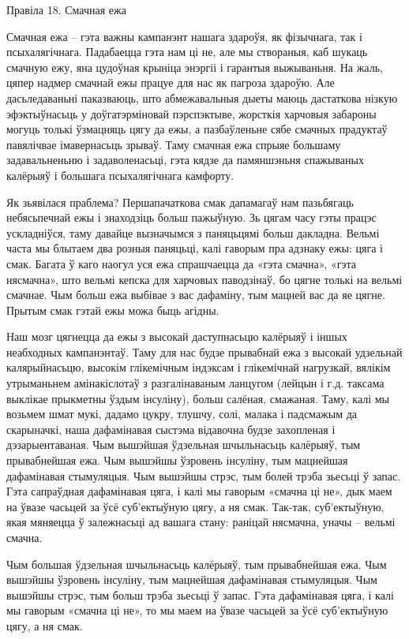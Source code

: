 Правіла 18. Смачная ежа

Смачная ежа – гэта важны кампанэнт нашага здароўя, як фізычнага, так і псыхалягічнага. Падабаецца гэта нам ці не, але мы створаныя, каб шукаць смачную ежу, яна цудоўная крыніца энэргіі і гарантыя выжываньня. На жаль, цяпер надмер смачнай ежы працуе для нас як пагроза здароўю. Але дасьледаваньні паказваюць, што абмежавальныя дыеты маюць дастаткова нізкую эфэктыўнасьць у доўгатэрміновай пэрспэктыве, жорсткія харчовыя забароны могуць толькі ўзмацняць цягу да ежы, а пазбаўленьне сябе смачных прадуктаў павялічвае імавернасьць зрываў. Таму смачная ежа спрыяе большаму задавальненьню і задаволенасьці, гэта кядзе да памяншэньня спажываных калёрыяў і большага псыхалягічнага камфорту.

Як зьявілася праблема?
Першапачаткова смак дапамагаў нам пазьбягаць небясьпечнай ежы і знаходзіць больш пажыўную. Зь цягам часу гэты працэс ускладніўся, таму давайце вызначымся з паняцьцямі больш дакладна. Вельмі часта мы блытаем два розныя паняцьці, калі гаворым пра адзнаку ежы: цяга і смак. Багата ў каго наогул уся ежа спрашчаецца да «гэта смачна», «гэта нясмачна», што вельмі кепска для харчовых паводзінаў, бо цягне толькі на вельмі смачнае. Чым больш ежа выбівае з вас дафаміну, тым мацней вас да яе цягне. Прытым смак гэтай ежы можа быць агідны.

Наш мозг цягнецца да ежы з высокай даступнасьцю калёрыяў і іншых неабходных кампанэнтаў. Таму для нас будзе прывабнай ежа з высокай удзельнай калярыйнасьцю, высокім глікемічным індэксам і глікемічнай нагрузкай, вялікім утрыманьнем амінакіслотаў з разгалінаваным ланцугом (лейцын і г.д. таксама выклікае прыкметны ўздым інсуліну), больш салёная, смажаная. Таму, калі мы возьмем шмат мукі, дадамо цукру, тлушчу, солі, малака і падсмажым да скарыначкі, наша дафамінавая сыстэма відавочна будзе захопленая і дэзарыентаваная. Чым вышэйшая ўдзельная шчыльнасьць калёрыяў, тым прывабнейшая ежа. Чым вышэйшы ўзровень інсуліну, тым мацнейшая дафамінавая стымуляцыя. Чым вышэйшы стрэс, тым болей трэба зьесьці ў запас. Гэта сапраўдная дафамінавая цяга, і калі мы гаворым «смачна ці не», дык маем на ўвазе часьцей за ўсё суб'ектыўную цягу, а ня смак. Так-так, суб'ектыўную, якая мяняецца ў залежнасьці ад вашага стану: раніцай нясмачна, уначы – вельмі смачна.

Чым большая ўдзельная шчыльнасьць калёрыяў, тым прывабнейшая ежа. Чым вышэйшы ўзровень інсуліну, тым мацнейшая дафамінавая стымуляцыя. Чым вышэйшы стрэс, тым больш трэба зьесьці ў запас. Гэта дафамінавая цяга, і калі мы гаворым «смачна ці не», то мы маем на ўвазе часьцей за ўсё суб'ектыўную цягу, а ня смак.

